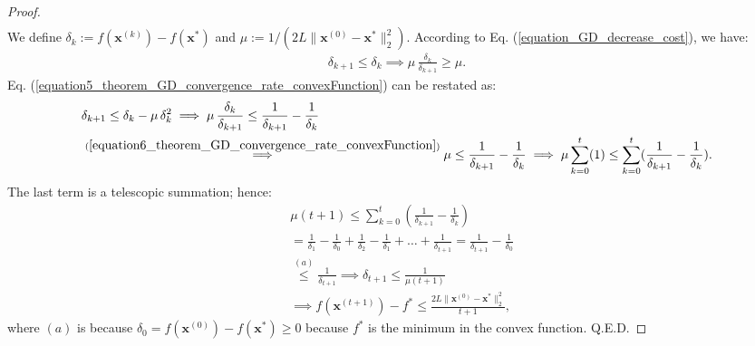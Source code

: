 \documentclass[lang=cn,10pt]{gorgeousnbook}
\numberwithin{equation}{section}%
\numberwithin{figure}{section}%
\begin{document}
\begin{proof}
\begin{align}
  \end{align}
  We define $\delta_k := f(\boldsymbol{x}^{(k)}) - f(\boldsymbol{x}^*)$ and $\mu := 1 /  (2L \|\boldsymbol{x}^{(0)} - \boldsymbol{x}^*\|_2^2)$. 
  According to Eq. (\ref{equation_GD_decrease_cost}), we have:
  \begin{align}\label{equation6_theorem_GD_convergence_rate_convexFunction}
  \delta_{k+1} \leq \delta_k \implies \mu\, \frac{\delta_k}{\delta_{k+1}} \geq \mu. 
  \end{align}
  Eq. (\ref{equation5_theorem_GD_convergence_rate_convexFunction}) can be restated as:
  \begin{align*}
  &\delta_{k+1} \leq \delta_k - \mu\, \delta_k^2 \implies \mu\, \frac{\delta_k}{\delta_{k+1}} \leq \frac{1}{\delta_{k+1}} - \frac{1}{\delta_k} \\
  &\overset{(\ref{equation6_theorem_GD_convergence_rate_convexFunction})}{\implies} \mu \leq \frac{1}{\delta_{k+1}} - \frac{1}{\delta_k} \implies \mu \sum_{k=0}^t (1) \leq \sum_{k=0}^t (\frac{1}{\delta_{k+1}} - \frac{1}{\delta_k}).
  \end{align*}
  The last term is a telescopic summation; hence:
  \begin{align*}
  &\mu (t+1) \leq \sum_{k=0}^t (\frac{1}{\delta_{k+1}} - \frac{1}{\delta_k}) \\
  &= \frac{1}{\delta_1} - \frac{1}{\delta_0} + \frac{1}{\delta_2} - \frac{1}{\delta_1} + \dots + \frac{1}{\delta_{t+1}} = \frac{1}{\delta_{t+1}} - \frac{1}{\delta_0} \\
  &\overset{(a)}{\leq} \frac{1}{\delta_{t+1}} \implies \delta_{t+1} \leq \frac{1}{\mu (t+1)} \\
  &\implies f(\boldsymbol{x}^{(t+1)}) - f^* \leq \frac{2 L \|\boldsymbol{x}^{(0)} - \boldsymbol{x}^*\|_2^2}{t+1},
  \end{align*}
  where $(a)$ is because $\delta_0 = f(\boldsymbol{x}^{(0)}) - f(\boldsymbol{x}^*) \geq 0$ because $f^*$ is the minimum in the convex function. Q.E.D.
\end{proof}
\end{document}
